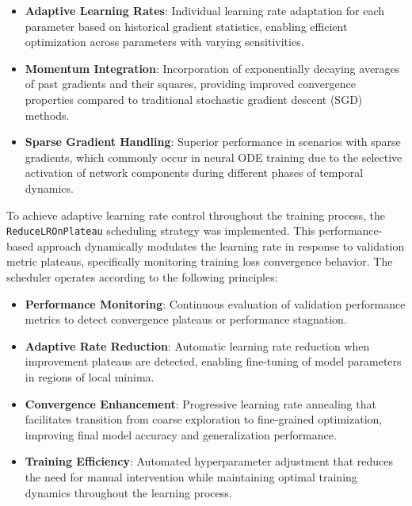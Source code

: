 \documentclass[11pt, oneside]{article}
\begin{document}
\begin{itemize}
    \item \textbf{Adaptive Learning Rates}: Individual learning rate adaptation for each parameter based on historical gradient statistics, enabling efficient optimization across parameters with varying sensitivities.

    \item \textbf{Momentum Integration}: Incorporation of exponentially decaying averages of past gradients and their squares, providing improved convergence properties compared to traditional stochastic gradient descent (SGD) methods.

    \item \textbf{Sparse Gradient Handling}: Superior performance in scenarios with sparse gradients, which commonly occur in neural ODE training due to the selective activation of network components during different phases of temporal dynamics.
\end{itemize}


To achieve adaptive learning rate control throughout the training process, the \texttt{ReduceLROnPlateau} scheduling strategy was implemented. This performance-based approach dynamically modulates the learning rate in response to validation metric plateaus, specifically monitoring training loss convergence behavior. The scheduler operates according to the following principles:

\begin{itemize}
    \item \textbf{Performance Monitoring}: Continuous evaluation of validation performance metrics to detect convergence plateaus or performance stagnation.

    \item \textbf{Adaptive Rate Reduction}: Automatic learning rate reduction when improvement plateaus are detected, enabling fine-tuning of model parameters in regions of local minima.

    \item \textbf{Convergence Enhancement}: Progressive learning rate annealing that facilitates transition from coarse exploration to fine-grained optimization, improving final model accuracy and generalization performance.

    \item \textbf{Training Efficiency}: Automated hyperparameter adjustment that reduces the need for manual intervention while maintaining optimal training dynamics throughout the learning process.
\end{itemize}
\end{document}
